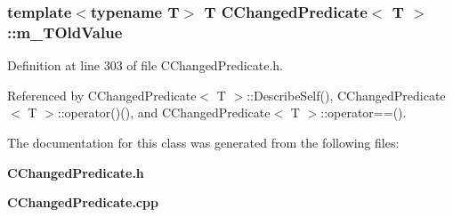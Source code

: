 \subsubsection{\setlength{\rightskip}{0pt plus 5cm}template$<$typename T$>$ T CChanged\-Predicate$<$ T $>$::m\_\-TOld\-Value\hspace{0.3cm}{\tt  [private]}}\label{classCChangedPredicate_o0}




Definition at line 303 of file CChanged\-Predicate.h.

Referenced by CChanged\-Predicate$<$ T $>$::Describe\-Self(), CChanged\-Predicate$<$ T $>$::operator()(), and CChanged\-Predicate$<$ T $>$::operator==().

The documentation for this class was generated from the following files:\begin{CompactItemize}
\item 
{\bf CChanged\-Predicate.h}\item 
{\bf CChanged\-Predicate.cpp}\end{CompactItemize}
